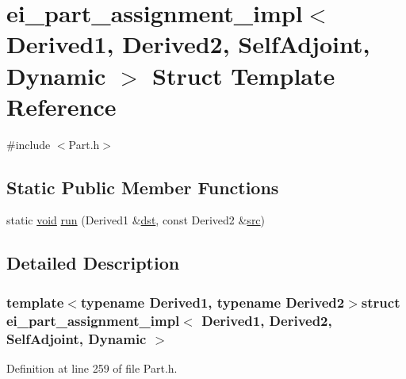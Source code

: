 \hypertarget{structei__part__assignment__impl_3_01_derived1_00_01_derived2_00_01_self_adjoint_00_01_dynamic_01_4}{\section{ei\-\_\-part\-\_\-assignment\-\_\-impl$<$ Derived1, Derived2, Self\-Adjoint, Dynamic $>$ Struct Template Reference}
\label{structei__part__assignment__impl_3_01_derived1_00_01_derived2_00_01_self_adjoint_00_01_dynamic_01_4}
}


{\ttfamily \#include $<$Part.\-h$>$}

\subsection*{Static Public Member Functions}
\begin{DoxyCompactItemize}
\item 
static \hyperlink{group___u_a_v_objects_plugin_ga444cf2ff3f0ecbe028adce838d373f5c}{void} \hyperlink{structei__part__assignment__impl_3_01_derived1_00_01_derived2_00_01_self_adjoint_00_01_dynamic_01_4_aaa5db9ce2765b5126a4e519f5ea74206}{run} (Derived1 \&\hyperlink{glext_8h_a92034251bfd455d524a9b5610cddba00}{dst}, const Derived2 \&\hyperlink{glext_8h_a72e0fdf0f845ded60b1fada9e9195cd7}{src})
\end{DoxyCompactItemize}


\subsection{Detailed Description}
\subsubsection*{template$<$typename Derived1, typename Derived2$>$struct ei\-\_\-part\-\_\-assignment\-\_\-impl$<$ Derived1, Derived2, Self\-Adjoint, Dynamic $>$}



Definition at line 259 of file Part.\-h.



